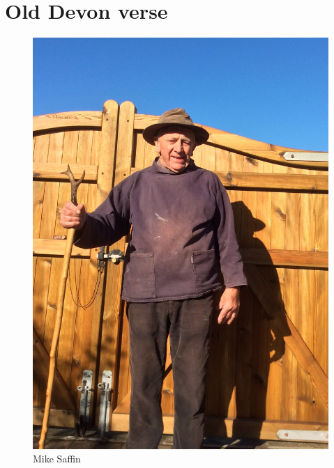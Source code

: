 \documentclass[twoside,11pt,a5paper]{memoir}
\begin{document}
\chapter{}

\chapter*{Old Devon verse}


\clearpage
\begin{figure}
  \centering
  \includegraphics[width=.9\linewidth]{pictures/cropped/Mike Saffin.jpg}
  \caption*{Mike Saffin}
\end{figure}
\end{document}
